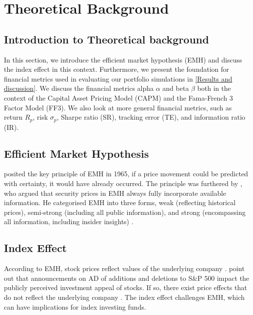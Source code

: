 \section{Theoretical Background}
\label{Theoretical background}

\subsection{Introduction to Theoretical background}

In this section, we introduce the efficient market hypothesis (EMH) and discuss the index effect in this context. Furthermore, we present the foundation for financial metrics used in evaluating our portfolio simulations in \autoref{Results and discussion}. We discuss the financial metrics alpha $\alpha$ and beta $\beta$ both in the context of the Capital Asset Pricing Model (CAPM) and the Fama-French 3 Factor Model (FF3). We also look at more general financial metrics, such as return $R_p$, risk $\sigma_p$, Sharpe ratio (SR), tracking error (TE), and information ratio (IR). 

\subsection{Efficient Market Hypothesis}

\textcite{samuelson-proof-that-properly-anticipated-prices-are-random} posited the key principle of EMH in 1965, if a price movement could be predicted with certainty, it would have already occurred. The principle was furthered by \textcite{fama-efficient-capital-markets-a-review-of-theory-and-empirical-work}, who argued that security prices in EMH always fully incorporate available information. He categorised EMH into three forms, weak (reflecting historical prices), semi-strong (including all public information), and strong (encompassing all information, including insider insights) \parencite{fama-efficient-capital-markets-a-review-of-theory-and-empirical-work}.

\subsection{Index Effect}

According to EMH, stock prices reflect values of the underlying company \parencite{fama-efficient-capital-markets-2}. \textcite{jain-the-effect-on-stock-price-of-inclusion-or-exclusion-from-the-s&p-500} point out that announcements on AD of additions and deletions to S\&P 500 impact the publicly perceived investment appeal of stocks. If so, there exist price effects that do not reflect the underlying company \parencite{jain-the-effect-on-stock-price-of-inclusion-or-exclusion-from-the-s&p-500}. The index effect challenges EMH, which can have implications for index investing funds. 

